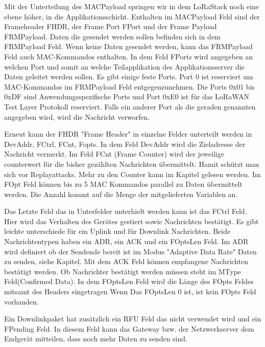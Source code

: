 \documentclass[a4paper,12pt]{article}
\begin{document}
            Mit der Unterteilung des MACPayload springen wir in dem LoRaStack noch eine ebene höher, in die 
            Applikationsschicht. Enthalten im MACPayload Feld sind der Frameheader FHDR, der Frame Port FPort und der 
            Frame Payload FRMPayload. Daten die gesendet werden sollen befinden sich in dem FRMPayload Feld. Wenn keine
            Daten gesendet werden, kann das FRMPayload Feld auch MAC-Kommandos enthalten. In dem Feld FPorts wird 
            angegeben an welchen Port und somit an welche Teilapplikation des Applikationsserver die Daten geleitet 
            werden sollen. Es gibt einige feste Ports. Port 0 ist reserviert um MAC-Kommandos im FRMPayload Feld 
            entgegenzunehmen. Die Ports 0x01 bis 0xDF sind Anwendungsspezifische Ports und Port 0xE0 ist für das 
            LoRaWAN Test Layer Protokoll reserviert. Falls ein anderer Port als die geraden genannten angegeben wird, 
            wird die Nachricht verworfen. 

            Erneut kann der FHDR "Frame Header" in einzelne Felder unterteilt werden in DevAddr, FCtrl, FCnt, Fopts. 
            In dem Feld DevAddr wird die Zieladresse der Nachricht vermerkt. Im Feld FCnt (Frame Counter) wird der 
            jeweilige counterwert für die bisher gezählten Nachrichten übermittelt. Hamit schützt man sich vor 
            Replayattacks. Mehr zu den Counter kann im Kapitel  gelesen werden. Im FOpt Feld 
            können bis zu 5 MAC Kommandos parallel zu Daten übermittelt werden. Die Anzahl kommt auf die Menge der 
            mitgelieferten Variablen an. 

            Das Letzte Feld das in Unterfelder unterhielt werden kann ist das FCtrl Feld. Hier wird das Verhalten des 
            Gerätes gestiert sowie Nachrichten bestätigt. Es gibt leichte unterschiede für ein Uplink und für Downlink 
            Nachrichten. Beide Nachrichtentypen haben ein ADR, ein ACK und ein FOptsLen Feld. Im ADR wird definiert 
            ob der Sendende bereit ist im Modus "Adaptive Data Rate" Daten zu senden, siehe Kapitel. 
            Mit dem ACK Feld können empfangene Nachrichten bestätigt werden. Ob Nachrichter bestätigt werden müssen 
            steht im MType Feld(Confirmed Data). In dem FOptsLen Feld wird die Länge des FOpts Feldes mitsamt des 
            Headers eingetragen Wenn Das FOptsLen 0 ist, ist kein FOpts Feld vorhanden.

            Ein Downlinkpaket hat zusätzlich ein RFU Feld das nicht verwendet wird und ein FPending Feld. In diesem 
            Feld kann das Gateway bzw. der Netzwerkserver dem Endgerät mitteilen, dass noch mehr Daten zu senden sind.
\end{document}
